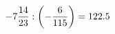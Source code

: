 \documentclass[preview]{standalone}
\begin{document}
\begin{align*}
-7 { 14 \over 23 }  :  \left( - { 6 \over 115 } \right) = 122.5
\end{align*}
\end{document}
